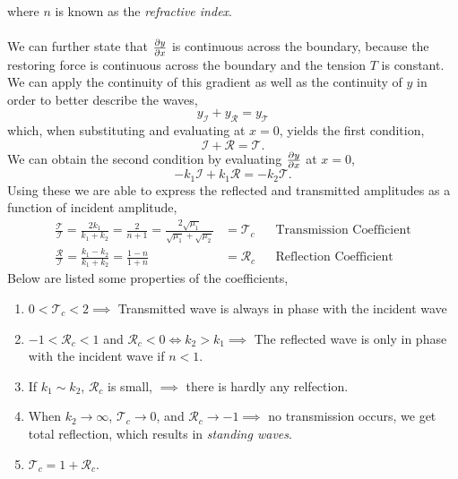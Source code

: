 \documentclass{book}
\begin{document}
where $n$ is known as the \textit{refractive index}.
\\\\
We can further state that $\pdv{y}{x}$ is continuous across the boundary, because the restoring force is continuous across the boundary and the tension $T$ is constant. We can apply the continuity of this gradient as well as the continuity of $y$ in order to better describe the waves,
\begin{equation}
    y_{\mathcal{I}} + y_{\mathcal{R}} = y_{\mathcal{T}}
\end{equation}
which, when substituting and evaluating at $x = 0$, yields the first condition,
\begin{equation}
    \mathcal{I} + \mathcal{R} = \mathcal{T}.
\end{equation}
We can obtain the second condition by evaluating $\pdv{y}{x}$ at $x= 0$, 
\begin{equation}
    -k_1\mathcal{I} +k_1\mathcal{R} = -k_2\mathcal{T}.
\end{equation}
Using these we are able to express the reflected and transmitted amplitudes as a function of incident amplitude,
\begin{align}
    \frac{\mathcal{T}}{\mathcal{I}} = \frac{2k_1}{k_1 + k_2} = \frac{2}{n+1} = \frac{2\sqrt{\mu_1}}{\sqrt{\mu_1} +\sqrt{\mu_2}} & = \mathcal{T}_c & &\text{Transmission Coefficient}\\
    \frac{\mathcal{R}}{\mathcal{I}} = \frac{k_1 - k_2}{k_1 + k_2} = \frac{1-n}{1+n} & = \mathcal{R}_c & &\text{Reflection Coefficient}
\end{align}
Below are listed some properties of the coefficients,
\begin{enumerate}
    \item $0 < \mathcal{T}_c < 2 \implies$ Transmitted wave is always in phase with the incident wave
    \item $-1 < \mathcal{R}_c < 1$ and $\mathcal{R}_c < 0 \iff k_2 > k_1 \implies$ The reflected wave is only in phase with the incident wave if $n < 1$.
    \item If $k_1 \sim k_2$, $\mathcal{R}_c$ is small, $\implies$ there is hardly any relfection.
    \item When $k_2 \to \infty$, $\mathcal{T}_c \to 0$, and $\mathcal{R}_c\to-1 \implies$ no transmission occurs, we get total reflection, which results in \textit{standing waves}.
    \item $\mathcal{T}_c = 1 + \mathcal{R}_c$.
\end{enumerate}
\end{document}
